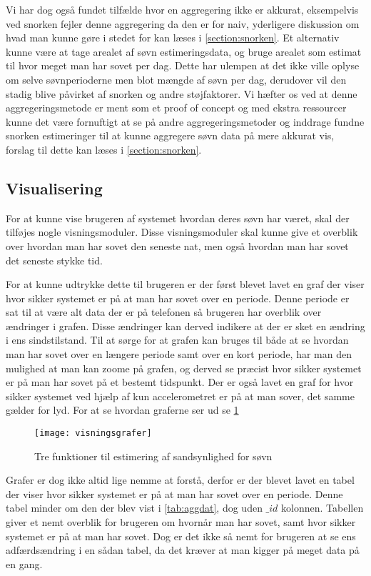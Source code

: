 Vi har dog også fundet tilfælde hvor en aggregering ikke er akkurat, eksempelvis ved snorken fejler denne aggregering da den er for naiv, yderligere diskussion om hvad man kunne gøre i stedet for kan læses i \cref{section:snorken}.
Et alternativ kunne være at tage arealet af søvn estimeringsdata, og bruge arealet som estimat til hvor meget man har sovet per dag.
Dette har ulempen at det ikke ville oplyse om selve søvnperioderne men blot mængde af søvn per dag, derudover vil den stadig blive påvirket af snorken og andre støjfaktorer.
Vi hæfter os ved at denne aggregeringsmetode er ment som et proof of concept og med ekstra ressourcer kunne det være fornuftigt at se på andre aggregeringsmetoder og inddrage fundne snorken estimeringer til at kunne aggregere søvn data på mere akkurat vis, forslag til dette kan læses i \cref{section:snorken}.

\subsection{Visualisering}\label{sec:pocVis}
For at kunne vise brugeren af systemet hvordan deres søvn har været, skal der tilføjes nogle visningsmoduler.
Disse visningsmoduler skal kunne give et overblik over hvordan man har sovet den seneste nat, men også hvordan man har sovet det seneste stykke tid.

For at kunne udtrykke dette til brugeren er der først blevet lavet en graf der viser hvor sikker systemet er på at man har sovet over en periode.
Denne periode er sat til at være alt data der er på telefonen så brugeren har overblik over ændringer i grafen.
Disse ændringer kan derved indikere at der er sket en ændring i ens sindstilstand.
Til at sørge for at grafen kan bruges til både at se hvordan man har sovet over en længere periode samt over en kort periode, har man den mulighed at man kan zoome på grafen, og derved se præcist hvor sikker systemet er på man har sovet på et bestemt tidspunkt.
Der er også lavet en graf for hvor sikker systemet ved hjælp af kun accelerometret er på at man sover, det samme gælder for lyd.
For at se hvordan graferne ser ud se \cref{fig:visningsgrafer}

\begin{figure}[h]
	\centering
	\texttt{[image: visningsgrafer]}
	\caption{Tre funktioner til estimering af sandsynlighed for søvn}\label{fig:visningsgrafer}
\end{figure}

Grafer er dog ikke altid lige nemme at forstå, derfor er der blevet lavet en tabel der viser hvor sikker systemet er på at man har sovet over en periode.
Denne tabel minder om den der blev vist i \cref{tab:aggdat}, dog uden $\_id$ kolonnen.
Tabellen giver et nemt overblik for brugeren om hvornår man har sovet, samt hvor sikker systemet er på at man har sovet.
Dog er det ikke så nemt for brugeren at se ens adfærdsændring i en sådan tabel, da det kræver at man kigger på meget data på en gang.

